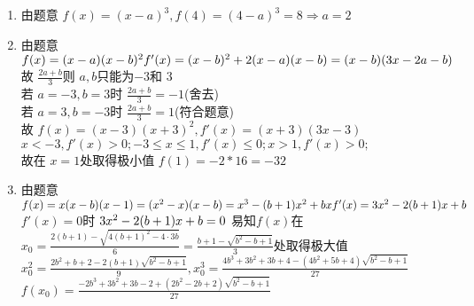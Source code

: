 \documentclass[class=ctexart,crop=false]{standalone}
\begin{document}
    \begin{enumerate}[label=(\arabic*)]
        \item 由题意 $f(x)=(x-a)^3,f(4)=(4-a)^3=8\Rightarrow a=2$
        \item 由题意 $f(x)=(x-a)(x-b)^2\\
            f'(x)=(x-b)^2+2(x-a)(x-b)=(x-b)(3x-2a-b)$\\
            故 $\frac{2a+b}{3}$则 $a,b$只能为$-3$和 $3$\\
            若 $a=-3,b=3$时 $\frac{2a+b}{3}=-1$(舍去)\\
            若 $a=3,b=-3$时 $\frac{2a+b}{3}=1$(符合题意)\\
            故 $f(x)=(x-3)(x+3)^2,f'(x)=(x+3)(3x-3)$\\
            $x<-3,f'(x)>0;-3\leqslant x \leqslant 1,f'(x)\leqslant 0;x>1,f'(x)>0;$\\
            故在 $x=1$处取得极小值 $f(1)=-2*16=-32$            
        \item 由题意 $f(x)=x(x-b)(x-1)=(x^2-x)(x-b)=x^3-(b+1)x^2+bx\\
        f'(x)=3x^2-2(b+1)x+b$\\
        $f'(x)=0$时 $3x^2-2(b+1)x+b=0\\$
        易知$f(x)$在$x_0=\frac{2(b+1)-\sqrt{4(b+1)^2-4\cdot 3b}}{6}
        =\frac{b+1-\sqrt{b^2-b+1}}{3}$处取得极大值\\
        $x_0^2=\frac{2b^2+b+2-2(b+1)\sqrt{b^2-b+1}}{9}, 
        x_0^3=\frac{4b^3+3b^2+3b+4-(4b^2+5b+4)\sqrt{b^2-b+1}}{27}$\\
        $f(x_0)=\frac{-2b^3+3b^2+3b-2+(2b^2-2b+2)\sqrt{b^2-b+1}}{27}$
    \end{enumerate}
\end{document}
